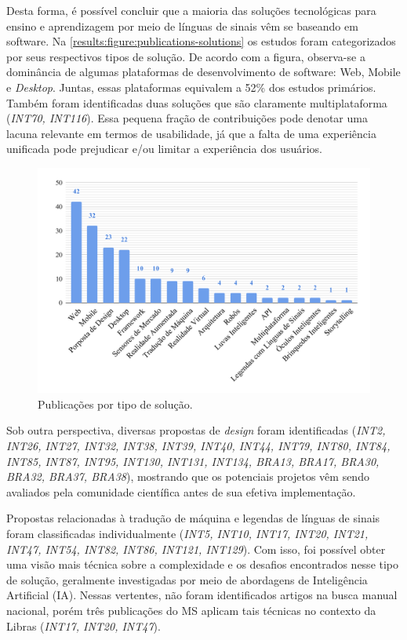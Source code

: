 Desta forma, é possível concluir que a maioria das soluções tecnológicas para ensino e aprendizagem por meio de línguas de sinais vêm se baseando em software. Na \autoref{results:figure:publications-solutions} os estudos foram categorizados por seus respectivos tipos de solução. De acordo com a figura, observa-se a dominância de algumas plataformas de desenvolvimento de software: Web, Mobile e \textit{Desktop}. Juntas, essas plataformas equivalem a 52\% dos estudos primários. Também foram identificadas duas soluções que são claramente multiplataforma (\textit{INT70, INT116}). Essa pequena fração de contribuições pode denotar uma lacuna relevante em termos de usabilidade, já que a falta de uma experiência unificada pode prejudicar e/ou limitar a experiência dos usuários.

\begin{figure}[htbp]
\caption{Publicações por tipo de solução.}
\label{results:figure:publications-solutions}
\centerline{\includegraphics[width=\columnwidth]{images/publications-solutions.pdf}}
\fautor
\end{figure}

Sob outra perspectiva, diversas propostas de \textit{design} foram identificadas (\textit{INT2, INT26, INT27, INT32, INT38, INT39, INT40, INT44, INT79, INT80, INT84, INT85, INT87, INT95, INT130, INT131, INT134, BRA13, BRA17, BRA30, BRA32, BRA37, BRA38}), mostrando que os potenciais projetos vêm sendo avaliados pela comunidade científica antes de sua efetiva implementação.

Propostas relacionadas à tradução de máquina e legendas de línguas de sinais foram classificadas individualmente (\textit{INT5, INT10, INT17, INT20, INT21, INT47, INT54, INT82, INT86, INT121, INT129}). Com isso, foi possível obter uma visão mais técnica sobre a complexidade e os desafios encontrados nesse tipo de solução, geralmente investigadas por meio de abordagens de Inteligência Artificial (IA). Nessas vertentes, não foram identificados artigos na busca manual nacional, porém três publicações do MS aplicam tais técnicas no contexto da Libras (\textit{INT17, INT20, INT47}). 

